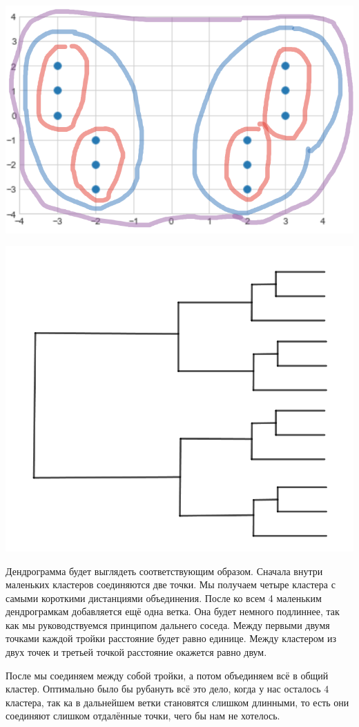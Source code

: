 \documentclass[12pt, a4paper, oneside]{article}
\begin{document}
{\begin{minipage}[t]{0.45\textwidth}
	\includegraphics[scale=0.25]{aglom.png}
\end{minipage}
\hfill
\begin{minipage}[t]{0.45\textwidth}
	\includegraphics[scale=0.18]{dendro.png}
\end{minipage}
 
Дендрограмма будет выглядеть соответствующим образом. Сначала внутри маленьких кластеров соединяются две точки. Мы получаем четыре кластера с самыми короткими дистанциями объединения. После ко всем 4 маленьким дендрограмкам добавляется ещё одна ветка. Она будет немного подлиннее, так как мы руководствуемся принципом дальнего соседа. Между первыми двумя точками каждой тройки расстояние будет равно единице. Между кластером из двух точек и третьей точкой расстояние окажется равно двум.

После мы соединяем между собой тройки, а потом объединяем всё в общий кластер. Оптимально было бы рубануть всё это дело, когда у нас осталось $4$ кластера, так ка в дальнейшем ветки становятся слишком длинными, то есть они соединяют слишком отдалённые точки, чего бы нам не хотелось.
 } 
\end{document}
